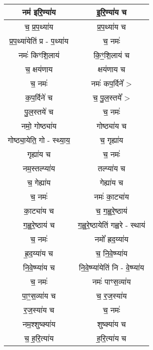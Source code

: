\subsection{}
{\centering
\begin{longtable}{|c|c|}
\hline
नम॑ इरि॒ण्या॑य                   & इ॒रि॒ण्या॑य च\\
\hline
च॒ प्र॒प॒थ्या॑य                    & प्र॒प॒थ्या॑य च\\
\hline
प्र॒प॒थ्या॑येति॑ प्र - प॒थ्या॑य         & च॒ नमः॑\\
\hline
नमः॑ किꣳशि॒लाय॑                 & कि॒ꣳ॒शि॒लाय॑ च\\
\hline
च॒ क्षय॑णाय                     & क्षय॑णाय च\\
\hline
च॒ नमः॑                        & नमः॑ कप॒र्दिने᳚ >\\
\hline
क॒प॒र्दिने॑ च                     & च॒ पु॒ल॒स्तये᳚ >\\
\hline
पु॒ल॒स्तये॑ च                      & च॒ नमः॑\\
\hline
नमो॒ गोष्ठ्या॑य                  & गोष्ठ्या॑य च\\
\hline
गोष्ठ्या॒येति॒ गो - स्थ्या॒य॒         & च॒ गृह्या॑य\\
\hline
गृह्या॑य च                      & च॒ नमः॑\\
\hline
नम॒स्तल्प्या॑य                    & तल्प्या॑य च\\
\hline
च॒ गेह्या॑य                      & गेह्या॑य च\\
\hline
च॒ नमः॑                        & नमः॑ का॒ट्या॑य\\
\hline
का॒ट्या॑य च                     & च॒ ग॒ह्व॒रे॒ष्ठाय॑\\
\hline
ग॒ह्व॒रे॒ष्ठाय॑ च                   & ग॒ह्व॒रे॒ष्ठायेति॑ गह्वरे - स्थाय॑\\
\hline
च॒ नमः॑                        & नमो᳚ ह्रद॒य्या॑य\\
\hline
ह्र॒द॒य्या॑य च                    & च॒ नि॒वे॒ष्प्या॑य\\
\hline
नि॒वे॒ष्प्या॑य च                   & नि॒वे॒ष्प्या॑येति॑ नि - वे॒ष्प्या॑य\\
\hline
च॒ नमः॑                        & नमः॑ पाꣳस॒व्या॑य\\
\hline
पा॒ꣳ॒स॒व्या॑य च                   & च॒ र॒ज॒स्या॑य\\
\hline
र॒ज॒स्या॑य च                     & च॒ नमः॑\\
\hline
नम॒श्शुष्क्या॑य                    & शुष्क्या॑य च\\
\hline
च॒ ह॒रि॒त्या॑य                    & ह॒रि॒त्या॑य च\\

\end{longtable}}
